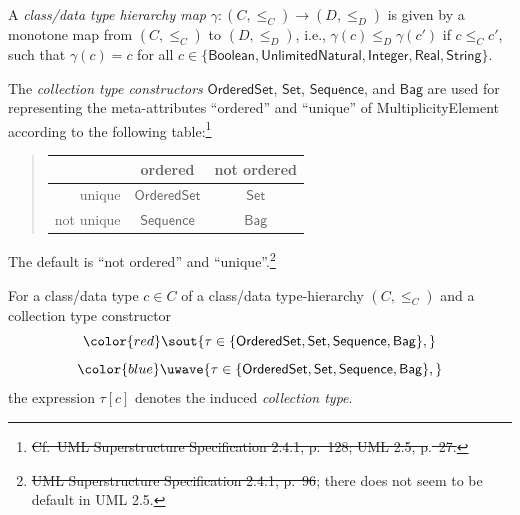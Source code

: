 \documentclass[10pt,fleqn,final]{scrreprt}
\newenvironment{definitions}[0]{\medskip }{}
\newcommand{\uml}[1]{\textsf{#1}}
\providecommand{\DIFadd}[1]{{\protect\color{blue}\uwave{#1}}} %
\providecommand{\DIFdel}[1]{{\protect\color{red}\sout{#1}}}                      %
\providecommand{\DIFaddbegin}{} %
\providecommand{\DIFaddend}{} %
\providecommand{\DIFdelbegin}{} %
\providecommand{\DIFdelend}{} %
\begin{document}
\begin{definitions}
A \emph{class/data type hierarchy map}
$\gamma : (C, {\leq_C}) \to (D, {\leq_D})$ is given by a monotone map
from $(C, {\leq_C})$ to $(D, {\leq_D})$, i.e.,
$\gamma(c) \leq_D \gamma(c')$ if $c \leq_C c'$, such that
$\gamma(c) = c$ for all
$c \in \{ \mathsf{Boolean},\allowbreak \mathsf{UnlimitedNatural},\allowbreak
\mathsf{Integer}, \mathsf{Real}, \mathsf{String} \}$.

\DIFdelbegin %
\DIFdelend The \emph{collection type constructors} $\mathsf{OrderedSet}$,
$\mathsf{Set}$, $\mathsf{Sequence}$, and $\mathsf{Bag}$ are used for
representing the meta-attributes ``ordered'' and ``unique'' of
\uml{MultiplicityElement} according to the following
table:\footnote{\DIFdelbegin \DIFdel{Cf.~UML Superstructure Specification 2.4.1, p.~128; UML
  2.5, p}\DIFdelend \DIFaddbegin \DIFadd{\mbox{%
\cite[p.~34]{uml-2.5}
}%
}\DIFaddend .\DIFdelbegin \DIFdel{~27.}\DIFdelend }
%
\begin{quotation}
\begin{tabular}{@{}r||c|c@{}}
             & ordered               & not ordered\\
\hline\hline
  unique     & $\mathsf{OrderedSet}$ & $\mathsf{Set}$\\
\hline
  not unique & $\mathsf{Sequence}$   & $\mathsf{Bag}$
\end{tabular}
\end{quotation}
%
The default is ``not ordered'' and
``unique''.\footnote{\DIFdelbegin \DIFdel{UML
  Superstructure Specification 2.4.1, p.~96}\DIFdelend \DIFaddbegin \DIFadd{\mbox{%
\cite[p.~96]{uml-2.4.1-super}
}%
}\DIFaddend ; there does not seem to be
  default in UML 2.5.}

For a class/data type $c \in C$ of a class/data type-hierarchy
$(C, {\leq_C})$ and a collection type constructor
\DIFdelbegin \begin{displaymath}\DIFdel{\tau \in \{ \mathsf{OrderedSet}, \mathsf{Set}, \mathsf{Sequence},
\mathsf{Bag} \},}\end{displaymath}
\DIFdelend %
\DIFaddbegin \begin{equation*}\DIFadd{
  \tau \in \{ \mathsf{OrderedSet}, \mathsf{Set}, \mathsf{Sequence},
\mathsf{Bag} \},
}\end{equation*}
\DIFaddend the expression $\tau[c]$ denotes the induced \emph{collection type}.


\end{definitions}
\end{document}
